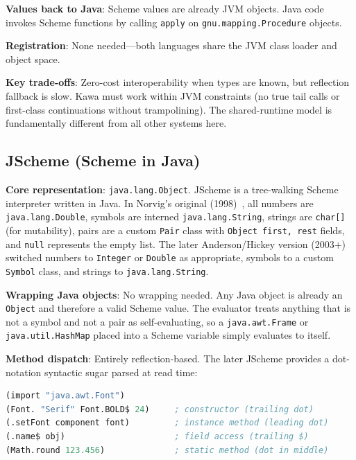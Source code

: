 \documentclass[11pt]{article}
\begin{document}
\textbf{Values back to Java}: Scheme values are already JVM objects.
Java code invokes Scheme functions by calling \texttt{apply} on
\texttt{gnu.mapping.Procedure} objects.

\textbf{Registration}: None needed---both languages share the JVM
class loader and object space.

\textbf{Key trade-offs}: Zero-cost interoperability when types are
known, but reflection fallback is slow.  Kawa must work within JVM
constraints (no true tail calls or first-class continuations without
trampolining).  The shared-runtime model is fundamentally different
from all other systems here.


\subsection{JScheme (Scheme in Java)}
\label{sec:jscheme}

\textbf{Core representation}: \texttt{java.lang.Object}.  JScheme is
a tree-walking Scheme interpreter written in Java.  In Norvig's
original (1998)~\cite{norvig1998}, all numbers are
\texttt{java.lang.Double}, symbols are interned
\texttt{java.lang.String}, strings are \texttt{char[]} (for
mutability), pairs are a custom \texttt{Pair} class with
\texttt{Object first, rest} fields, and \texttt{null} represents the
empty list.  The later Anderson/Hickey version
(2003+)~\cite{anderson2003} switched numbers to \texttt{Integer} or
\texttt{Double} as appropriate, symbols to a custom \texttt{Symbol}
class, and strings to \texttt{java.lang.String}.

\textbf{Wrapping Java objects}: No wrapping needed.  Any Java object
is already an \texttt{Object} and therefore a valid Scheme value.  The
evaluator treats anything that is not a symbol and not a pair as
self-evaluating, so a \texttt{java.awt.Frame} or
\texttt{java.util.HashMap} placed into a Scheme variable simply
evaluates to itself.

\textbf{Method dispatch}: Entirely reflection-based.  The later
JScheme provides a dot-notation syntactic sugar parsed at read time:

\begin{lstlisting}[language=Scheme]
(import "java.awt.Font")
(Font. "Serif" Font.BOLD$ 24)     ; constructor (trailing dot)
(.setFont component font)         ; instance method (leading dot)
(.name$ obj)                      ; field access (trailing $)
(Math.round 123.456)              ; static method (dot in middle)
\end{lstlisting}
\end{document}
